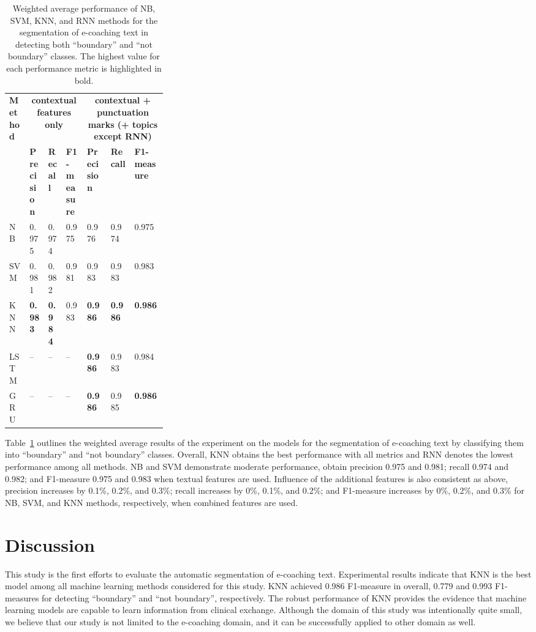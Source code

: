 \documentclass{amia}
\begin{document}
\begin{table}[ht]
\centering
\caption{Weighted average performance of NB, SVM, KNN, and RNN methods for the segmentation of e-coaching text in detecting both ``boundary'' and ``not boundary'' classes. The highest value for each performance metric is highlighted in bold.}
\label{tab:result_weighted_avg}
  \begin{tabular}{|l|l|l|l|p{0.15\linewidth}|p{0.15\linewidth}|l|}
  \hline
   \multirow{2}{*}{\textbf{Method}} & \multicolumn{3}{|c|}{\textbf{contextual features only}} & \multicolumn{3}{|c|}{\textbf{contextual + punctuation marks (+ topics except RNN)}} \\\cline{2-7}
   & \textbf{Precision}  & \textbf{Recall} & \textbf{F1-measure} & \textbf{Precision}  & \textbf{Recall} & \textbf{F1-measure}\\ \hline    
    
 NB & 0.975 & 0.974 & 0.975 & 0.976 & 0.974 & 0.975 \\ \hline
 SVM & 0.981 & 0.982 & 0.981 & 0.983 & 0.983 & 0.983\\ \hline
 KNN & \textbf{0.983} & \textbf{0.984} & 0.983 & \textbf{0.986} & \textbf{0.986} & \textbf{0.986}\\ \hline
 LSTM & -- & -- & -- & \textbf{0.986} & 0.983 & 0.984 \\ \hline
 GRU & -- & -- & -- & \textbf{0.986} & 0.985 & \textbf{0.986} \\ \hline 
  \end{tabular}
\end{table} 

Table~\ref{tab:result_weighted_avg} outlines the weighted average results of the experiment on the models for the segmentation of e-coaching text by classifying them into ``boundary'' and ``not boundary'' classes. Overall, KNN obtains the best performance with all metrics and RNN denotes the lowest performance among all methods. NB and SVM demonstrate moderate performance, obtain precision 0.975 and 0.981; recall 0.974 and 0.982; and F1-measure 0.975 and 0.983 when textual features are used. Influence of the additional features is also consistent as above, precision increases by 0.1\%, 0.2\%, and 0.3\%; recall increases by 0\%, 0.1\%, and 0.2\%; and F1-measure increases by 0\%, 0.2\%, and 0.3\% for NB, SVM, and KNN methods, respectively, when combined features are used.\\

\section*{Discussion}
This study is the first efforts to evaluate the automatic segmentation of e-coaching text. Experimental results indicate that KNN is the best model among all machine learning methods considered for this study. KNN achieved 0.986 F1-measure in overall, 0.779 and 0.993 F1-measures for detecting ``boundary'' and ``not boundary'', respectively. The robust performance of KNN provides the evidence that machine learning models are capable to learn information from clinical exchange. Although the domain of this study was intentionally quite small, we believe that our study is not limited to the e-coaching domain, and it can be successfully applied to other domain as well.
\end{document}
